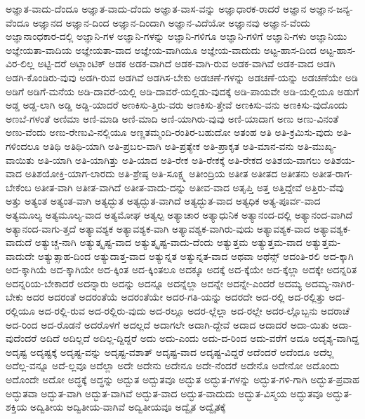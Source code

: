 {ಅಜ್ಞಾತ-ವಾದು-ದೆಂದೂ
ಅಜ್ಞಾತ-ವಾದು-ದೆಂದು
ಅಜ್ಞಾತ-ವಾಸ-ವನ್ನು
ಅಜ್ಞಾಧಾರಕ-ರಾದರೆ
ಅಜ್ಞಾನ
ಅಜ್ಞಾನ-ಜನ್ಯ-ವೆಂದೂ
ಅಜ್ಞಾನದ
ಅಜ್ಞಾನ-ದಿಂದ
ಅಜ್ಞಾನ-ದಿಂದಾಗಿ
ಅಜ್ಞಾನ-ವಿದೆಯೋ
ಅಜ್ಞಾನವು
ಅಜ್ಞಾನ-ವೆಂದು
ಅಜ್ಞಾನಾಂಧಕಾರ-ದಲ್ಲಿ
ಅಜ್ಞಾನಿ-ಗಳ
ಅಜ್ಞಾನಿ-ಗಳನ್ನು
ಅಜ್ಞಾನಿ-ಗಳಿಗೂ
ಅಜ್ಞಾನಿ-ಗಳಿಗೆ
ಅಜ್ಞಾನಿ-ಗಳು
ಅಜ್ಞಾನಿಯು
ಅಜ್ಞೇಯತಾ-ವಾದಿಯ
ಅಜ್ಞೇಯತಾ-ವಾದ
ಅಜ್ಞೇಯ-ವಾಗಿಯೂ
ಅಜ್ಞೇಯ-ವಾದುದು
ಅಟ್ಟ-ಹಾಸ-ದಿಂದ
ಅಟ್ಟ-ಹಾಸ-ವಿರ-ಲಿಲ್ಲ
ಅಟ್ಟಿ-ದರೆ
ಅಟ್ಲಾಂಟಿಕ್
ಅಡಕ
ಅಡಕ-ವಾಗಿದೆ
ಅಡಕ-ವಾಗಿ-ರುವ
ಅಡಕ-ವಾಗಿವೆ
ಅಡಕ-ವಾದ
ಅಡಗಿ
ಅಡಗಿ-ಕೊಂಡಿರು-ವುವು
ಅಡಗಿ-ರುವ
ಅಡಗಿವೆ
ಅಡಗಿಸ-ಬೇಕು
ಅಡಚಣೆ-ಗಳನ್ನು
ಅಡಚಣೆ-ಯನ್ನು
ಅಡಚಣೆಯೇ
ಅಡಿ
ಅಡಿಗೆ
ಅಡಿಗೆ-ಮನೆಯ
ಅಡಿ-ದಾವರೆ-ಯಲ್ಲಿ
ಅಡಿ-ದಾವರೆ-ಯಲ್ಲಿಡು-ವುದಕ್ಕೆ
ಅಡಿ-ಪಾಯವೇ
ಅಡಿ-ಯಲ್ಲಿಯೂ
ಅಡುಗೆ
ಅಡ್ಡ
ಅಡ್ಡ-ಲಾಗಿ
ಅಡ್ಡಿ
ಅಡ್ಡಿ-ಯಾದರೆ
ಅಣಕಿಸು-ತ್ತಿರು-ವರು
ಅಣಕಿಸು-ತ್ತೇವೆ
ಅಣಕಿಸು-ವನು
ಅಣಕಿಸು-ವುದೊಂದು
ಅಣಬೆ-ಗಳಂತೆ
ಅಣಿಮಾ
ಅಣಿ-ಮಾಡಿ
ಅಣಿ-ಮಾದಿ
ಅಣಿ-ಯಾಗಿರು-ವುವು
ಅಣಿ-ಯಾದಾಗ
ಅಣು
ಅಣು-ವಿನಂತೆ
ಅಣು-ವೆಂದು
ಅಣು-ರೇಣುವಿ-ನಲ್ಲಿಯೂ
ಅಣ್ಣತಮ್ಮಂದಿ-ರಂತಿರ-ಬಹುದೋ
ಅತಂಹ
ಅತಿ
ಅತಿ-ಕ್ರಮಿಸು-ವುದು
ಅತಿ-ಗಳಿಂದಲೂ
ಅತಿಥಿ
ಅತಿಥಿ-ಯಾಗಿ
ಅತಿ-ಪ್ರಬಲ-ವಾಗಿ
ಅತಿ-ಪ್ರತ್ಯೇಕ
ಅತಿ-ಪ್ರಾಕೃತ
ಅತಿ-ಮಾನ-ವನು
ಅತಿ-ಮುಖ್ಯ-ವಾಯಿತು
ಅತಿ-ಯಾಗಿ
ಅತಿ-ಯಾಗಿತ್ತು
ಅತಿ-ಯಾದ
ಅತಿ-ರೇಕ
ಅತಿ-ರೇಕಕ್ಕೆ
ಅತಿ-ರೇಕದ
ಅತಿಶಯ-ವಾಗಲು
ಅತಿಶಯ-ವಾದ
ಅತಿಶಯೋಕ್ತಿ-ಯಾಗ-ಲಾರದು
ಅತಿ-ಶ್ರೇಷ್ಠ
ಅತಿ-ಸೂಕ್ಷ್ಮ
ಅತೀಂದ್ರಿಯ
ಅತೀತ
ಅತೀತದ
ಅತೀತನು
ಅತೀತ-ರಾಗ-ಬೇಕೆಂಬ
ಅತೀತ-ವಾಗಿ
ಅತೀತ-ವಾಗಿದೆ
ಅತೀತ-ವಾದು-ದನ್ನು
ಅತೀವ-ವಾದ
ಅತೃಪ್ತಿ
ಅತ್ತ
ಅತ್ತಿದ್ದೇವೆ
ಅತ್ತಿರು-ವೆವು
ಅತ್ತು
ಅತ್ಯಂತ
ಅತ್ಯಂತ-ವಾಗಿ
ಅತ್ಯದ್ಭುತ
ಅತ್ಯದ್ಭುತ-ವಾಗಿದೆ
ಅತ್ಯದ್ಭುತ-ವಾದ
ಅತ್ಯಧಿಕ
ಅತ್ಯ-ಪೂರ್ವ-ವಾದ
ಅತ್ಯಮೂಲ್ಯ
ಅತ್ಯಮೂಲ್ಯ-ವಾದ
ಅತ್ಯಮೋಘ
ಅತ್ಯಲ್ಪ
ಅತ್ಯಾಚಾರ
ಅತ್ಯಾಧುನಿಕ
ಅತ್ಯಾನಂದ-ದಲ್ಲಿ
ಅತ್ಯಾನಂದ-ವಾಗಿದೆ
ಅತ್ಯಾನಂದ-ವಾಗು-ತ್ತದೆ
ಅತ್ಯಾವಶ್ಯಕ
ಅತ್ಯಾವಶ್ಯಕ-ವಾಗಿ
ಅತ್ಯಾವಶ್ಯಕ-ವಾಗಿರು-ವುದು
ಅತ್ಯಾವಶ್ಯಕ-ವಾದ
ಅತ್ಯಾವಶ್ಯಕ-ವಾದುದೆ
ಅತ್ಯುಚ್ಚ-ನಾಗಿ
ಅತ್ಯುತ್ಕೃಷ್ಟ-ವಾದ
ಅತ್ಯುತ್ಕೃಷ್ಟ-ವಾದು-ದೆಂದು
ಅತ್ಯುತ್ತಮ
ಅತ್ಯುತ್ತಮ-ವಾದ
ಅತ್ಯುತ್ತಮ-ವಾದುದೇ
ಅತ್ಯುತ್ಸಾಹ-ದಿಂದ
ಅತ್ಯುದಾತ್ತ-ವಾದ
ಅತ್ಯುನ್ನತ
ಅತ್ಯುನ್ನತ-ವಾದ
ಅಥವಾ
ಅಥೆನ್ಸ್
ಅದಂತಿ-ರಲಿ
ಅದ-ಕ್ಕಾಗಿ
ಅದ-ಕ್ಕಾಗಿಯೆ
ಅದ-ಕ್ಕಾಗಿಯೇ
ಅದ-ಕ್ಕಿಂತ
ಅದ-ಕ್ಕಿಂತಲೂ
ಅದಕ್ಕೂ
ಅದಕ್ಕೆ
ಅದ-ಕ್ಕೆಯೇ
ಅದ-ಕ್ಕೆಲ್ಲಾ
ಅದಕ್ಕೇ
ಅದನ್ನರಿತ
ಅದನ್ನರಿಯ-ಬೇಕಾದರೆ
ಅದನ್ನಾರು
ಅದನ್ನು
ಅದನ್ನೂ
ಅದನ್ನೆಲ್ಲಾ
ಅದನ್ನೇ
ಅದನ್ನೇ-ಎಂದರೆ
ಅದಮ್ಯ
ಅದಮ್ಯ-ನಾಗಿರ-ಬೇಕು
ಅದರ
ಅದರಂತೆ
ಅದರಂತೆಯೆ
ಅದರಂತೆಯೇ
ಅದರ-ಗತಿ-ಯನ್ನು
ಅದರದೇ
ಅದ-ರಲ್ಲಿ
ಅದ-ರಲ್ಲಿತ್ತು
ಅದ-ರಲ್ಲಿಯೂ
ಅದ-ರಲ್ಲಿ-ರುವ
ಅದ-ರಲ್ಲಿರು-ವುದು
ಅದ-ರಲ್ಲೂ
ಅದರ-ಲ್ಲೆಲ್ಲಾ
ಅದ-ರಲ್ಲೇ
ಅದರ-ಲ್ಲೊಬ್ಬನು
ಅದರಾಚೆ
ಅದ-ರಿಂದ
ಅದ-ರೊಡನೆ
ಅದರೊಳಗೆ
ಅದಲ್ಲದೆ
ಅದಾಗಲೇ
ಅದಾಗಿ-ದ್ದೇವೆ
ಅದಾದ
ಅದಾದರೆ
ಅದಾ-ಯಿತು
ಅದಾ-ವುದೆಂದರೆ
ಅದಿದೆ
ಅದಿಲ್ಲದೆ
ಅದಿಲ್ಲ-ದ್ದಿದ್ದರೆ
ಅದು
ಅದು-ಎಂದು
ಅದು-ದ-ರಿಂದ
ಅದು-ವರೆಗೆ
ಅದೂ
ಅದೃಶ್ಯ-ವಾಗಿದ್ದ
ಅದೃಷ್ಟ
ಅದೃಷ್ಟಕ್ಕೆ
ಅದೃಷ್ಟ-ವನ್ನು
ಅದೃಷ್ಟ-ವಶಾತ್
ಅದೃಷ್ಟ-ವಾದ
ಅದೃಷ್ಟ-ವಿದ್ದರೆ
ಅದೆಂದರೆ
ಅದೆಂದೂ
ಅದೆಲ್ಲ
ಅದೆಲ್ಲ-ವನ್ನೂ
ಅದೆ-ಲ್ಲವೂ
ಅದೆಲ್ಲಾ
ಅದೇ
ಅದೇನು
ಅದೇನೂ
ಅದೇ-ನೆಂದರೆ
ಅದೇನೊ
ಅದೇನೋ
ಅದೊಂದು
ಅದೊಂದೇ
ಅದೋ
ಅದ್ಧಕ್ಕೆ
ಅದ್ಧನ್ನು
ಅದ್ಬುತ
ಅದ್ಬುತವೂ
ಅದ್ಭುತ
ಅದ್ಭುತ-ಗಳನ್ನು
ಅದ್ಭುತ-ಗಳಿ-ಗಾಗಿ
ಅದ್ಭುತ-ಪ್ರವಾಹ
ಅದ್ಭುತವಾ
ಅದ್ಭುತ-ವಾಗಿ
ಅದ್ಭುತ-ವಾಗಿವೆ
ಅದ್ಭುತ-ವಾದ
ಅದ್ಭುತ-ವಾದುದು
ಅದ್ಭುತ-ವಿಸ್ಮಯ
ಅದ್ಭುತವೂ
ಅದ್ಭುತ-ಶಕ್ತಿಯ
ಅದ್ವಿತೀಯ
ಅದ್ವಿತೀಯ-ವಾಗಿವೆ
ಅದ್ವಿತೀಯವೂ
ಅದ್ವೈತ
ಅದ್ವೈತಕ್ಕೆ
}

